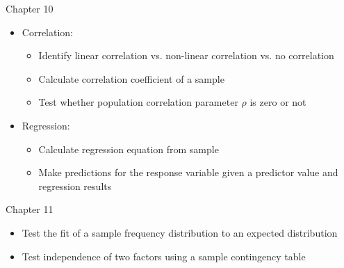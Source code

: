 \documentclass[xcolor=table]{beamer}
\begin{document}
\begin{frame}{Chapter 10}
\begin{block}{}
\begin{itemize}
\item Correlation:
\begin{itemize}
\item Identify linear correlation vs. non-linear correlation vs. no correlation
\item Calculate correlation coefficient of a sample
\item Test whether population correlation parameter $\rho$ is zero or not
\end{itemize}
\item Regression:
\begin{itemize}
\item Calculate regression equation from sample
\item Make predictions for the response variable given a predictor value and regression results
\end{itemize}
\end{itemize}
\end{block}
\end{frame}

\begin{frame}{Chapter 11}
\begin{block}{}
\begin{itemize}
\item Test the fit of a sample frequency distribution to an expected distribution
\item Test independence of two factors using a sample contingency table

\end{itemize}
\end{block}
\end{frame}
\end{document}
